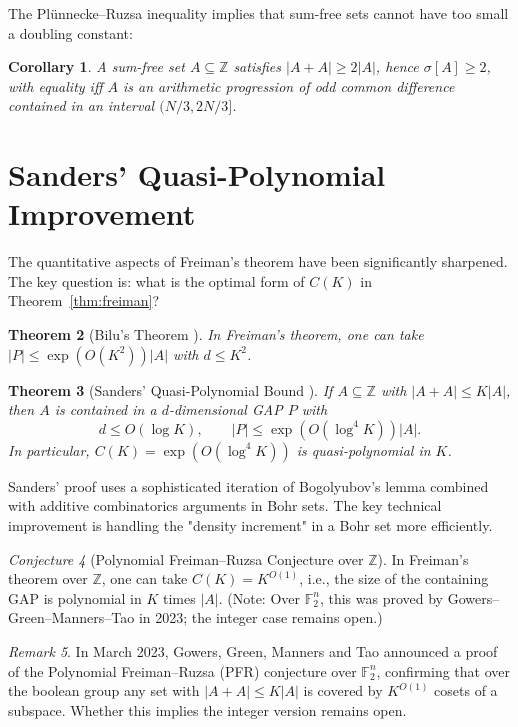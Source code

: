 \documentclass[12pt,a4paper]{amsart}
\newtheorem{theorem}{Theorem}[section]
\newtheorem{corollary}[theorem]{Corollary}
\theoremstyle{definition}
\theoremstyle{remark}
\newtheorem{remark}[theorem]{Remark}
\newtheorem{conjecture}[theorem]{Conjecture}
\newcommand{\F}{\mathbb{F}}
\newcommand{\Z}{\mathbb{Z}}
\begin{document}
The Plünnecke--Ruzsa inequality implies that sum-free sets cannot have too small
a doubling constant:

\begin{corollary}
A sum-free set $A \subseteq \Z$ satisfies $|A + A| \geq 2|A|$, hence
$\sigma[A] \geq 2$, with equality iff $A$ is an arithmetic progression of odd
common difference contained in an interval $(N/3, 2N/3]$.
\end{corollary}

\section{Sanders' Quasi-Polynomial Improvement}\label{sec:sanders}

The quantitative aspects of Freiman's theorem have been significantly sharpened.
The key question is: what is the optimal form of $C(K)$ in Theorem~\ref{thm:freiman}?

\begin{theorem}[Bilu's Theorem \cite{Bilu1999}]\label{thm:bilu}
In Freiman's theorem, one can take $|P| \leq \exp(O(K^2)) |A|$ with $d \leq K^2$.
\end{theorem}

\begin{theorem}[Sanders' Quasi-Polynomial Bound \cite{Sanders2012}]\label{thm:sanders}
If $A \subseteq \Z$ with $|A + A| \leq K|A|$, then $A$ is contained in a
$d$-dimensional GAP $P$ with
\[
  d \leq O(\log K), \qquad |P| \leq \exp(O(\log^4 K)) |A|.
\]
In particular, $C(K) = \exp(O(\log^4 K))$ is quasi-polynomial in $K$.
\end{theorem}

Sanders' proof uses a sophisticated iteration of Bogolyubov's lemma combined with
additive combinatorics arguments in Bohr sets. The key technical improvement is
handling the "density increment" in a Bohr set more efficiently.

\begin{conjecture}[Polynomial Freiman--Ruzsa Conjecture over $\Z$]\label{conj:pfr}
In Freiman's theorem over $\Z$, one can take $C(K) = K^{O(1)}$, i.e., the size of the
containing GAP is polynomial in $K$ times $|A|$. (Note: Over $\F_2^n$, this was
proved by Gowers--Green--Manners--Tao in 2023; the integer case remains open.)
\end{conjecture}

\begin{remark}
In March 2023, Gowers, Green, Manners and Tao \cite{GowersTao2023} announced a
proof of the Polynomial Freiman--Ruzsa (PFR) conjecture over $\F_2^n$, confirming
that over the boolean group any set with $|A+A| \leq K|A|$ is covered by $K^{O(1)}$
cosets of a subspace. Whether this implies the integer version remains open.
\end{remark}
\end{document}

